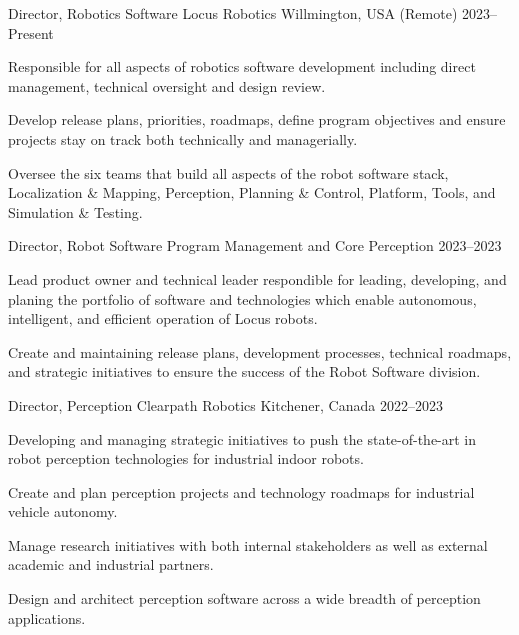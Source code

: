 \documentclass[11pt, a4paper]{awesome-cv}
\begin{document}
\vspace*{-4mm}
\begin{cventries}
\vspace*{-1mm}
\cventry
  {Director, Robotics Software}
  {Locus Robotics}
  {Willmington, USA (Remote)}
  {2023--Present}
  {
    \begin{cvitems}
      \item Responsible for all aspects of robotics software development including direct management, technical oversight and design review.
      \item Develop release plans, priorities, roadmaps, define program objectives and ensure projects stay on track both technically and managerially.
      \item Oversee the six teams that build all aspects of the robot software stack, Localization \& Mapping, Perception, Planning \& Control, Platform, Tools, and Simulation \& Testing.
    \end{cvitems}
  }

\vspace*{-2mm}
\cventry
  {Director, Robot Software Program Management and Core Perception}
  {}
  {}
  {2023--2023}
  {
    \begin{cvitems}
      \item Lead product owner and technical leader respondible for leading, developing, and planing the portfolio of software and technologies which enable autonomous, intelligent, and efficient operation of Locus robots.
      \item Create and maintaining release plans, development processes, technical roadmaps, and strategic initiatives to ensure the success of the Robot Software division.    
    \end{cvitems} 
  }


\cventry
  {Director, Perception}
  {Clearpath Robotics}
  {Kitchener, Canada}
  {2022--2023}
  {
    \begin{cvitems}
      \item Developing and managing strategic initiatives to push the state-of-the-art in robot perception technologies for industrial indoor robots. 
      \item Create and plan perception projects and technology roadmaps for industrial vehicle autonomy. 
      \item Manage research initiatives with both internal stakeholders as well as external academic and industrial partners. 
      \item Design and architect perception software across a wide breadth of perception applications.
    \end{cvitems} 
  }


\end{cventries}
\end{document}
